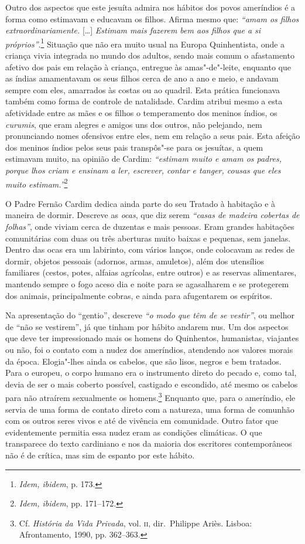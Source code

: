 Outro dos aspectos que este jesuíta admira nos hábitos dos povos
ameríndios é a forma como estimavam e educavam os filhos. Afirma mesmo
que: \textit{``amam os filhos extraordinariamente.} [\ldots{}] \textit{Estimam
mais fazerem bem aos filhos que a si próprios''}.\footnote{ \textit{Idem, ibidem}, 
p. 173.} Situação que não era muito usual na
Europa Quinhentista, onde a criança vivia integrada no mundo dos
adultos, sendo mais comum o afastamento afetivo dos pais em relação à
criança, entregue às amas"-de"-leite, enquanto que as índias amamentavam
os seus filhos cerca de ano a ano e meio, e andavam sempre com eles,
amarrados às costas ou ao quadril. Esta prática funcionava também como
forma de controle de natalidade. Cardim atribui mesmo a esta
afetividade entre as mães e os filhos o temperamento dos meninos
índios, os \textit{curumis}, que eram alegres e amigos uns dos outros,
não pelejando, nem pronunciando nomes ofensivos entre eles, nem em
relação a seus pais. Esta afeição dos meninos índios pelos seus pais
transpôs"-se para os jesuítas, a quem estimavam muito, na opinião de
Cardim: \textit{``estimam muito e amam os padres, porque lhos
criam e ensinam a ler, escrever, contar e tanger, cousas que eles muito
estimam.''}\footnote{ \textit{Idem, ibidem}, pp. 171--172.} 

 O Padre Fernão Cardim dedica ainda parte do seu Tratado 
à habitação e à maneira de dormir. Descreve as \textit{ocas}, que diz
serem \textit{``casas de madeira cobertas de folhas''}, onde
viviam cerca de duzentas e mais pessoas. Eram grandes habitações
comunitárias com duas ou três aberturas muito baixas e pequenas, sem
janelas. Dentro das ocas era um labirinto, com vários lanços, 
onde colocavam as redes de dormir, objetos pessoais (adornos, armas, amuletos), além dos
utensílios familiares (cestos, potes, alfaias agrícolas, entre outros)
e as reservas alimentares, mantendo sempre o fogo aceso dia e noite
para se agasalharem e se protegerem dos animais, principalmente cobras,
e ainda para afugentarem os espíritos. 

 Na apresentação do ``gentio'', descreve \textit{``o modo
que têm de se vestir''}, ou melhor de ``não se vestirem'', já que
tinham por hábito andarem nus. Um dos aspectos que deve ter
impressionado mais os homens do Quinhentos, humanistas, viajantes ou
não, foi o contato com a nudez dos ameríndios, atendendo aos valores
morais da época. Elogia"-lhes ainda os cabelos, que são lisos, negros e
bem tratados. Para o europeu, o corpo humano era o instrumento direto
do pecado e, como tal, devia de ser o mais coberto possível, castigado
e escondido, até mesmo os cabelos para não atraírem sexualmente os
homens.\footnote{ Cf. \textit{História da Vida Privada}, vol. \textsc{ii},
dir.~Philippe Ariès. Lisboa: Afrontamento, 
1990, pp. 362--363.} Enquanto que, para o ameríndio, ele servia de uma forma de
contato direto com a natureza, uma forma de comunhão com os outros
seres vivos e até de vivência em comunidade. Outro fator que
evidentemente permitia essa nudez eram as condições climáticas. O que
transparece do texto cardiniano e nos da maioria dos escritores
contemporâneos não é de crítica, mas sim de espanto por este hábito.

